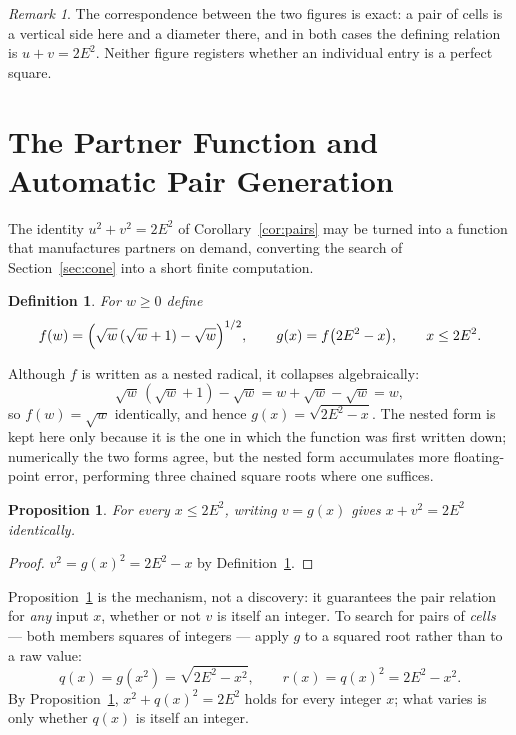 \documentclass[12pt]{article}
\newtheorem{proposition}[theorem]{Proposition}
\newtheorem{definition}[theorem]{Definition}
\theoremstyle{remark}
\newtheorem{remark}[theorem]{Remark}
\begin{document}
\begin{remark}
The correspondence between the two figures is exact: a pair of cells is
a vertical side here and a diameter there, and in both cases the
defining relation is $u + v = 2E^2$. Neither figure registers whether
an individual entry is a perfect square.
\end{remark}
\section{The Partner Function and Automatic Pair Generation}\label{sec:partner}

The identity $u^2+v^2=2E^2$ of Corollary~\ref{cor:pairs} may be turned
into a function that manufactures partners on demand, converting the
search of Section~\ref{sec:cone} into a short finite computation.

\begin{definition}\label{def:fg}
For $w \ge 0$ define
\[
f(w) = \Bigl(\sqrt w\,(\sqrt w + 1) - \sqrt w\Bigr)^{1/2},
\qquad
g(x) = f\bigl(2E^2 - x\bigr), \qquad x \le 2E^2 .
\]
\end{definition}

Although $f$ is written as a nested radical, it collapses algebraically:
\[
\sqrt w\,(\sqrt w+1)-\sqrt w = w+\sqrt w-\sqrt w = w ,
\]
so $f(w)=\sqrt w$ identically, and hence $g(x) = \sqrt{2E^2-x}$. The
nested form is kept here only because it is the one in which the
function was first written down; numerically the two forms agree, but
the nested form accumulates more floating-point error, performing three
chained square roots where one suffices.

\begin{proposition}\label{prop:partner}
For every $x \le 2E^2$, writing $v=g(x)$ gives $x+v^2=2E^2$
identically.
\end{proposition}

\begin{proof}
$v^2 = g(x)^2 = 2E^2-x$ by Definition~\ref{def:fg}.
\end{proof}

Proposition~\ref{prop:partner} is the mechanism, not a discovery: it
guarantees the pair relation for \emph{any} input $x$, whether or not
$v$ is itself an integer. To search for pairs of \emph{cells} --- both
members squares of integers --- apply $g$ to a squared root rather than
to a raw value:
\[
q(x) = g(x^2) = \sqrt{2E^2-x^2}, \qquad r(x) = q(x)^2 = 2E^2-x^2 .
\]
By Proposition~\ref{prop:partner}, $x^2+q(x)^2=2E^2$ holds for every
integer $x$; what varies is only whether $q(x)$ is itself an integer.
\end{document}
